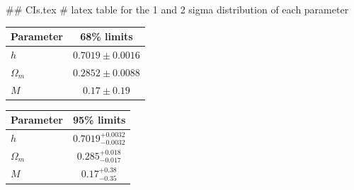 ## CIs.tex
# latex table for the 1 and 2 sigma distribution of each parameter

\begin{tabular} { l  c}
 Parameter &  68\% limits\\
\hline
{\boldmath$h              $} & $0.7019\pm 0.0016          $\\
{\boldmath$\Omega_m       $} & $0.2852\pm 0.0088          $\\
{\boldmath$M              $} & $0.17\pm 0.19              $\\
\hline
\end{tabular}

\begin{tabular} { l  c}
 Parameter &  95\% limits\\
\hline
{\boldmath$h              $} & $0.7019^{+0.0032}_{-0.0032}$\\
{\boldmath$\Omega_m       $} & $0.285^{+0.018}_{-0.017}   $\\
{\boldmath$M              $} & $0.17^{+0.38}_{-0.35}      $\\
\hline
\end{tabular}

